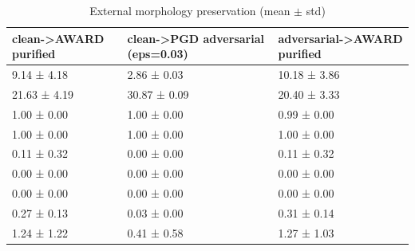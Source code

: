 \begin{table}[htbp]\centering\small
\caption{External morphology preservation (mean $\pm$ std)}\label{tab:extmorph}
\begin{tabular}{lll}
\hline
clean->AWARD purified & clean->PGD adversarial (eps=0.03) & adversarial->AWARD purified \\
\hline
9.14 ± 4.18 & 2.86 ± 0.03 & 10.18 ± 3.86 \\
21.63 ± 4.19 & 30.87 ± 0.09 & 20.40 ± 3.33 \\
1.00 ± 0.00 & 1.00 ± 0.00 & 0.99 ± 0.00 \\
1.00 ± 0.00 & 1.00 ± 0.00 & 1.00 ± 0.00 \\
0.11 ± 0.32 & 0.00 ± 0.00 & 0.11 ± 0.32 \\
0.00 ± 0.00 & 0.00 ± 0.00 & 0.00 ± 0.00 \\
0.00 ± 0.00 & 0.00 ± 0.00 & 0.00 ± 0.00 \\
0.27 ± 0.13 & 0.03 ± 0.00 & 0.31 ± 0.14 \\
1.24 ± 1.22 & 0.41 ± 0.58 & 1.27 ± 1.03 \\
\hline
\end{tabular}
\end{table}
